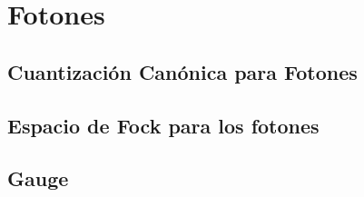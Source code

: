 \section{Fotones}

\subsection{Cuantización Canónica para Fotones}

\subsection{Espacio de Fock para los fotones}

\subsection{Gauge}

